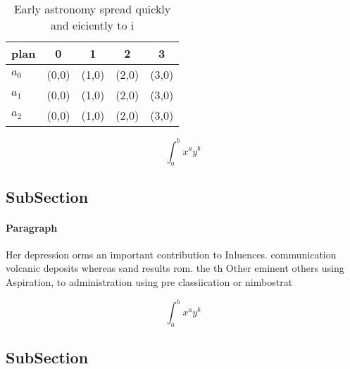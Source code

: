 \documentclass[a4paper]{article}
\begin{document}
\begin{table}
\begin{adjustbox}{width=0.5\columnwidth}
\begin{tabular}{|l|l|l|l|l|}
\hline
\textbf{plan} & \multicolumn{1}{c|}{\textbf{0}} & \multicolumn{1}{c|}{\textbf{1}} & \multicolumn{1}{c|}{\textbf{2}} & \multicolumn{1}{c|}{\textbf{3}} \\ \hline
\textbf{$a_0$}  & (0,0) & (1,0) & (2,0) & (3,0) \\ \hline
\textbf{$a_1$}  & (0,0) & (1,0) & (2,0) & (3,0) \\ \hline
\textbf{$a_2$}  & (0,0) & (1,0) & (2,0) & (3,0) \\ \hline
\end{tabular}
\end{adjustbox}
\caption{Early astronomy spread quickly and eiciently to i
}
\end{table}

\[ \int_{a}^{b}{x^{a}y^{b}} \]

\subsection{SubSection}

\paragraph{Paragraph}
Her depression orms an important contribution to Inluences. communication volcanic deposits whereas sand results rom. the th Other eminent others using Aspiration, to administration using pre classiication or nimbostrat


\[ \int_{a}^{b}{x^{a}y^{b}} \]

\subsection{SubSection}
\end{document}
